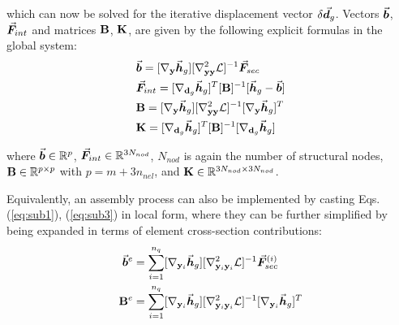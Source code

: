 \noindent which can now be solved for the iterative displacement vector
$\delta\vec{\bm{d}}_g$. Vectors $\vec{\bm{b}}$, $\vec{\bm{F}}_{int}$ and matrices
$\mathbf{B}$, $\mathbf{K}$, are given by the following explicit formulas
in the global system:
\begin{subequations}
	\begin{align}
		&\vec{\bm{b}}
		=[\nabla_{\mathbf{y}}\vec{\bm{h}}_g][\nabla^2_{\mathbf{yy}}\mathcal{L}]^{-1}\vec{\bm{F}}_{sec}\label{eq:sub1}\\
		&\vec{\bm{F}}_{int} =
		[\nabla_{\mathbf{d}_g}\vec{\bm{h}}_g]^T[\mathbf{B}]^{-1}[\vec{\bm{h}}_g-\vec{\bm{b}}]\label{eq:sub2}\\
		&\mathbf{B}
		=[\nabla_{\mathbf{y}}\vec{\bm{h}}_g][\nabla^2_{\mathbf{yy}}\mathcal{L}]^{-1}[\nabla_{\mathbf{y}}\vec{\bm{h}}_g]^T
		 \label{eq:sub3}\\
		&\mathbf{K}
		=[\nabla_{\mathbf{d}_g}\vec{\bm{h}}_g]^T[\mathbf{B}]^{-1}[\nabla_{\mathbf{d}_g}\vec{\bm{h}}_g]\label{eq:sub4}
	\end{align}
\end{subequations}

\noindent where $\vec{\bm{b}}\in\mathbb{R}^p$, 
$\vec{\bm{F}}_{int}\in\mathbb{R}^{3N_{nod}}$,
$N_{nod}$ is again the number of structural nodes,
$\mathbf{B}\in\mathbb{R}^{p\times p}$ with $p=m+3n_{nel}$, and
$\mathbf{K}\in\mathbb{R}^{3N_{nod}\times 3N_{nod}}$. 

Equivalently, an
assembly process can also be implemented by casting 
Eqs. (\ref{eq:sub1}), (\ref{eq:sub3}) in local form, where they can be further 
simplified by being expanded in terms of element cross-section contributions:
\begin{subequations}
	\begin{align}
		\vec{\bm{b}}^e&=\sum_{i=1}^{n_q}
		[\nabla_{\mathbf{y}_i}\vec{\bm{h}}_g][\nabla^2_{\mathbf{y}_i\mathbf{y}_i}\mathcal{L}]^{-1}\vec{\bm{F}}_{sec}^{(i)}\label{eq:subb}\\
		\mathbf{B}^e &= \sum_{i=1}^{n_q}
		[\nabla_{\mathbf{y}_i}\vec{\bm{h}}_g][\nabla^2_{\mathbf{y}_i\mathbf{y}_i}\mathcal{L}]^{-1}[\nabla_{\mathbf{y}_i}\vec{\bm{h}}_g]^T\label{eq:subB}
	\end{align}
\end{subequations}



